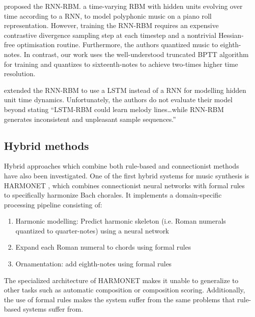 \citet{Boulanger-Lewandowski2012} proposed the RNN-RBM. a time-varying RBM with
hidden units evolving over time according to a RNN, to model polyphonic music
on a piano roll representation. However, training the RNN-RBM requires an
expensive contrastive divergence sampling step at each timestep and a
nontrivial Hessian-free optimisation routine. Furthermore, the authors
quantized music to eighth-notes. In contrast, our work uses the well-understood
truncated BPTT algorithm for training and quantizes to sixteenth-notes to achieve
two-times higher time resolution.

\citet{Lyu2015} extended the RNN-RBM\citep{Boulanger-Lewandowski2012} to use a
LSTM instead of a RNN for modelling hidden unit time dynamics. Unfortunately,
the authors do not evaluate their model beyond stating ``LSTM-RBM could learn
melody lines\ldots while RNN-RBM generates inconsistent and unpleasant sample
sequences.''

\subsection{Hybrid methods}

Hybrid approaches which combine both rule-based and connectionist methods have
also been investigated. One of the first hybrid systems for music synthesis is
HARMONET \citep{hild1991harmonet}, which combines connectionist neural networks
with formal rules to specifically harmonize Bach chorales. It implements a
domain-specific processing pipeline consisting of:
\begin{enumerate}
  \item Harmonic modelling: Predict harmonic skeleton (i.e. Roman numerals
  quantized to quarter-notes) using a neural network
  \item Expand each Roman numeral to chords using formal rules
  \item Ornamentation: add eighth-notes using formal rules
\end{enumerate}
The specialized architecture of HARMONET makes it unable to generalize
to other tasks such as automatic composition or composition scoring.
Additionally, the use of formal rules makes the system suffer from the same
problems that rule-based systems suffer from.

